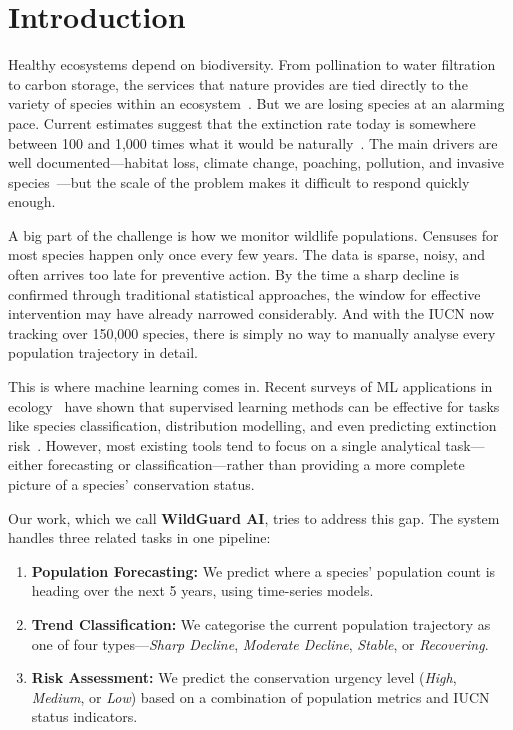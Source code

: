 \documentclass[conference]{IEEEtran}
\begin{document}
\section{Introduction}

Healthy ecosystems depend on biodiversity. From pollination to water filtration to carbon storage, the services that nature provides are tied directly to the variety of species within an ecosystem~\cite{ceballos2015}. But we are losing species at an alarming pace. Current estimates suggest that the extinction rate today is somewhere between 100 and 1,000 times what it would be naturally~\cite{pimm2014}. The main drivers are well documented---habitat loss, climate change, poaching, pollution, and invasive species~\cite{iucn2024}---but the scale of the problem makes it difficult to respond quickly enough.

A big part of the challenge is how we monitor wildlife populations. Censuses for most species happen only once every few years. The data is sparse, noisy, and often arrives too late for preventive action. By the time a sharp decline is confirmed through traditional statistical approaches, the window for effective intervention may have already narrowed considerably. And with the IUCN now tracking over 150,000 species, there is simply no way to manually analyse every population trajectory in detail.

This is where machine learning comes in. Recent surveys of ML applications in ecology~\cite{tuia2022} have shown that supervised learning methods can be effective for tasks like species classification, distribution modelling, and even predicting extinction risk~\cite{silvestro2022}. However, most existing tools tend to focus on a single analytical task---either forecasting or classification---rather than providing a more complete picture of a species' conservation status.

Our work, which we call \textbf{WildGuard AI}, tries to address this gap. The system handles three related tasks in one pipeline:

\begin{enumerate}
\item \textbf{Population Forecasting:} We predict where a species' population count is heading over the next 5 years, using time-series models.
\item \textbf{Trend Classification:} We categorise the current population trajectory as one of four types---\textit{Sharp Decline}, \textit{Moderate Decline}, \textit{Stable}, or \textit{Recovering}.
\item \textbf{Risk Assessment:} We predict the conservation urgency level (\textit{High}, \textit{Medium}, or \textit{Low}) based on a combination of population metrics and IUCN status indicators.
\end{enumerate}
\end{document}
